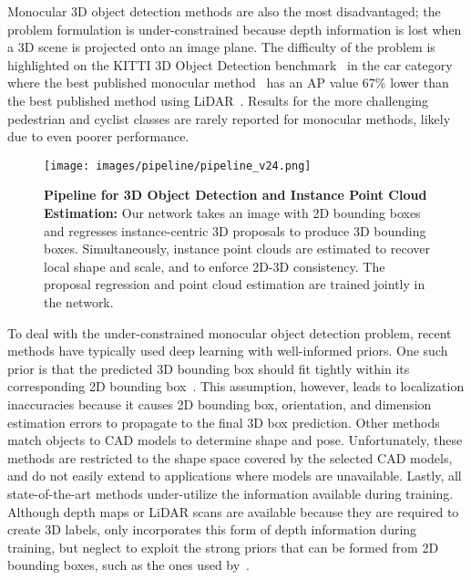 \documentclass[10pt,twocolumn,letterpaper]{article}
\begin{document}
	Monocular 3D object detection methods are also the most disadvantaged; the problem formulation is under-constrained because depth information is lost when a 3D scene is projected onto an image plane. The difficulty of the problem is highlighted on the KITTI 3D Object Detection benchmark~\cite{geiger_kitti} in the car category where the best published monocular method~\cite{lindernoren} has an AP value $67\%$ lower than the best published method using LiDAR~\cite{yan2018second}. Results for the more challenging pedestrian and cyclist classes are rarely reported for monocular methods, likely due to even poorer performance.
	
	\begin{figure}[t!]
		\begin{center}
			\texttt{[image: images/pipeline/pipeline\_v24.png]}
		\end{center}
		\caption{\textbf{Pipeline for 3D Object Detection and Instance Point Cloud Estimation:} Our network takes an image with 2D bounding boxes and regresses instance-centric 3D proposals to produce 3D bounding boxes. Simultaneously, instance point clouds are estimated to recover local shape and scale, and to enforce 2D-3D consistency. The proposal regression and point cloud estimation are trained jointly in the network.}
		\label{fig:pipeline}
	\end{figure}
	
	To deal with the under-constrained monocular object detection problem, recent methods have typically used deep learning with well-informed priors. One such prior is that the predicted 3D bounding box should fit tightly within its corresponding 2D bounding box~\cite{mousavian_deep3dbox}. This assumption, however, leads to localization inaccuracies because it causes 2D bounding box, orientation, and dimension estimation errors to propagate to the final 3D box prediction. Other methods~\cite{chabot_deepmanta, kundu_3drcnn} match objects to CAD models to determine shape and pose. Unfortunately, these methods are restricted to the shape space covered by the selected CAD models, and do not easily extend to applications where models are unavailable. Lastly, all state-of-the-art methods under-utilize the information available during training. Although depth maps or LiDAR scans are available because they are required to create 3D labels, only \cite{xu_multifusion} incorporates this form of depth information during training, but neglect to exploit the strong priors that can be formed from 2D bounding boxes, such as the ones used by~\cite{lindernoren, mousavian_deep3dbox}.
	
\end{document}
